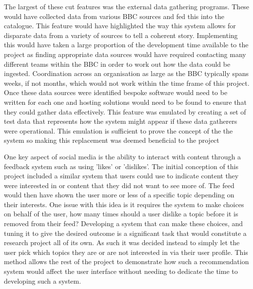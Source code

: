 \documentclass[12pt,titlepage]{article}
\begin{document}
  The largest of these cut features was the external data gathering programs.
  These would have collected data from various BBC sources and fed this into the
  catalogue. This feature would have highlighted the way this system allows for
  disparate data from a variety of sources to tell a coherent story.
  Implementing this would have taken a large proportion of the development time
  available to the project as finding appropriate data sources would have
  required contacting many different teams within the BBC in order to work out
  how the data could be ingested. Coordination across an organisation as large
  as the BBC typically spans weeks, if not months, which would not work within
  the time frame of this project. Once these data sources were identified
  bespoke software would need to be written for each one and hosting solutions
  would need to be found to ensure that they could gather data effectively. This
  feature was emulated by creating a set of test data that represents how the
  system might appear if these data gatherers were operational. This emulation
  is sufficient to prove the concept of the the system so making this
  replacement was deemed beneficial to the project

  One key aspect of social media is the ability to interact with content through
  a feedback system such as using 'likes' or 'dislikes'. The initial conception
  of this project included a similar system that users could use to indicate
  content they were interested in or content that they did not want to see more
  of. The feed would then have shown the user more or less of a specific topic
  depending on their interests. One issue with this idea is it requires the
  system to make choices on behalf of the user, how many times should a user
  dislike a topic before it is removed from their feed? Developing a system that
  can make these choices, and tuning it to give the desired outcome is a
  significant task that would constitute a research project all of its own. As
  such it was decided instead to simply let the user pick which topics they are
  or are not interested in via their user profile. This method allows the rest
  of the project to demonstrate how such a recommendation system would affect
  the user interface without needing to dedicate the time to developing such a
  system.



\end{document}

